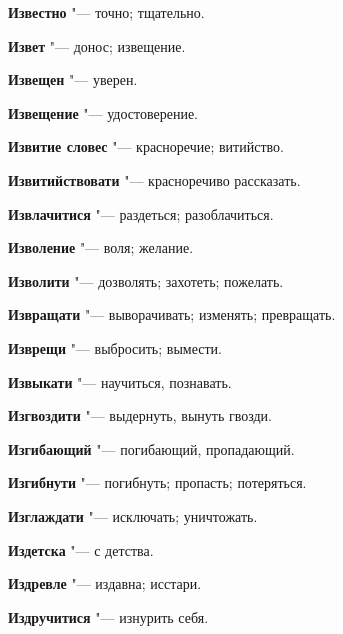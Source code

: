 \begin{mymulticols}{2}
\noindent\textbf{Известно} "--- точно; тщательно. 




\noindent\textbf{Извет} "--- донос; извещение. 




\noindent\textbf{Извещен} "--- уверен. 




\noindent\textbf{Извещение} "--- удостоверение. 




\noindent\textbf{Извитие словес} "--- красноречие; витийство. 




\noindent\textbf{Извитийствовати} "--- красноречиво рассказать. 




\noindent\textbf{Извлачитися} "--- раздеться; разоблачиться. 




\noindent\textbf{Изволение} "--- воля; желание. 




\noindent\textbf{Изволити} "--- дозволять; захотеть; пожелать. 




\noindent\textbf{Извращати} "--- выворачивать; изменять; превращать. 




\noindent\textbf{Изврещи} "--- выбросить; вымести. 




\noindent\textbf{Извыкати} "--- научиться, познавать. 




\noindent\textbf{Изгвоздити} "--- выдернуть, вынуть гвозди. 




\noindent\textbf{Изгибающий} "--- погибающий, пропадающий. 




\noindent\textbf{Изгибнути} "--- погибнуть; пропасть; потеряться. 




\noindent\textbf{Изглаждати} "--- исключать; уничтожать. 




\noindent\textbf{Издетска} "--- с детства. 




\noindent\textbf{Издревле} "--- издавна; исстари. 




\noindent\textbf{Издручитися} "--- изнурить себя. 





\end{mymulticols}
